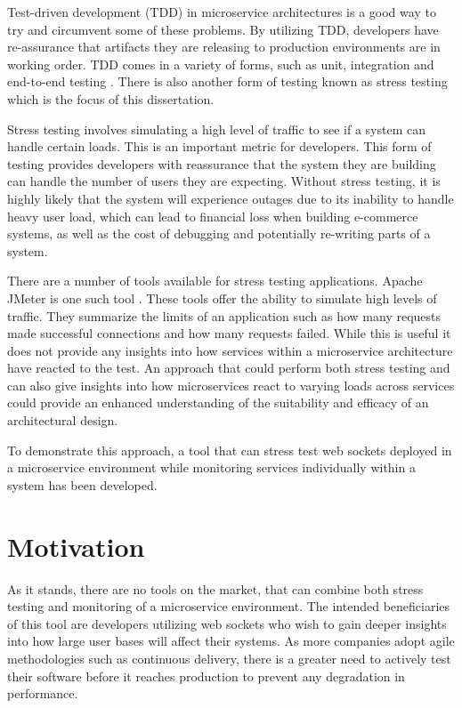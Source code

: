 Test-driven development (TDD) in microservice architectures is a good way to try and circumvent some of these problems. By utilizing TDD, developers have re-assurance that artifacts they are releasing to production environments are in working order. TDD comes in a variety of forms, such as unit, integration and end-to-end testing \cite{7160271}. There is also another form of testing known as stress testing which is the focus of this dissertation.

Stress testing involves simulating a high level of traffic to see if a system can handle certain loads. This is an important metric for developers. This form of testing provides developers with reassurance that the system they are building can handle the number of users they are expecting. Without stress testing, it is highly likely that the system will experience outages due to its inability to handle heavy user load, which can lead to financial loss when building e-commerce systems, as well as the cost of debugging and potentially re-writing parts of a system.

There are a number of tools available for stress testing applications. Apache JMeter is one such tool \cite{jmeter}. These tools offer the ability to simulate high levels of traffic. They summarize the limits of an application such as how many requests made successful connections and how many requests failed. While this is useful it does not provide any insights into how services within a microservice architecture have reacted to the test. An approach that could perform both stress testing and can also give insights into how microservices react to varying loads across services could provide an enhanced understanding of the suitability and efficacy of an architectural design. 

To demonstrate this approach, a tool that can stress test web sockets deployed in a microservice environment while monitoring services individually within a system has been developed.

\section{Motivation}

As it stands, there are no tools on the market, that can combine both stress testing and monitoring of a microservice environment. The intended beneficiaries of this tool are developers utilizing web sockets who wish to gain deeper insights into how large user bases will affect their systems. As more companies adopt agile methodologies such as continuous delivery, there is a greater need to actively test their software before it reaches production to prevent any degradation in performance.


